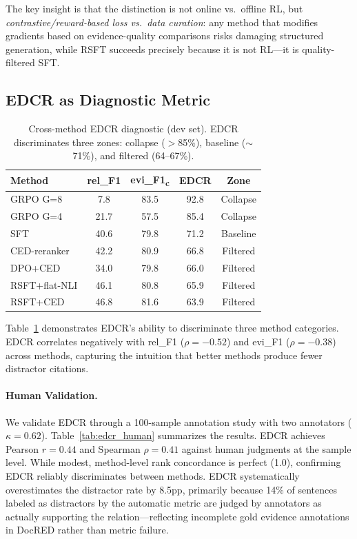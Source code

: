 \documentclass[11pt]{article}
\begin{document}
The key insight is that the distinction is not online vs.\ offline RL, but \emph{contrastive/reward-based loss vs.\ data curation}: any method that modifies gradients based on evidence-quality comparisons risks damaging structured generation, while RSFT succeeds precisely because it is not RL---it is quality-filtered SFT.

\subsection{EDCR as Diagnostic Metric}

\begin{table}[t]
\centering
\small
\begin{tabular}{lcccc}
\toprule
\textbf{Method} & \textbf{rel\_F1} & \textbf{evi\_F1\textsubscript{c}} & \textbf{EDCR} & \textbf{Zone} \\
\midrule
GRPO G=8 & 7.8 & 83.5 & 92.8 & Collapse \\
GRPO G=4 & 21.7 & 57.5 & 85.4 & Collapse \\
SFT & 40.6 & 79.8 & 71.2 & Baseline \\
CED-reranker & 42.2 & 80.9 & 66.8 & Filtered \\
DPO+CED & 34.0 & 79.8 & 66.0 & Filtered \\
RSFT+flat-NLI & 46.1 & 80.8 & 65.9 & Filtered \\
RSFT+CED & 46.8 & 81.6 & 63.9 & Filtered \\
\bottomrule
\end{tabular}
\caption{Cross-method EDCR diagnostic (dev set). EDCR discriminates three zones: collapse ($>$85\%), baseline (${\sim}$71\%), and filtered (64--67\%).}
\label{tab:edcr_diagnostic}
\end{table}

Table~\ref{tab:edcr_diagnostic} demonstrates EDCR's ability to discriminate three method categories.
EDCR correlates negatively with rel\_F1 ($\rho{=}{-}0.52$) and evi\_F1 ($\rho{=}{-}0.38$) across methods, capturing the intuition that better methods produce fewer distractor citations.

\paragraph{Human Validation.}
We validate EDCR through a 100-sample annotation study with two annotators ($\kappa{=}0.62$).
Table~\ref{tab:edcr_human} summarizes the results.
EDCR achieves Pearson $r{=}0.44$ and Spearman $\rho{=}0.41$ against human judgments at the sample level.
While modest, method-level rank concordance is perfect (1.0), confirming EDCR reliably discriminates between methods.
EDCR systematically overestimates the distractor rate by 8.5pp, primarily because 14\% of sentences labeled as distractors by the automatic metric are judged by annotators as actually supporting the relation---reflecting incomplete gold evidence annotations in DocRED rather than metric failure.
\end{document}
